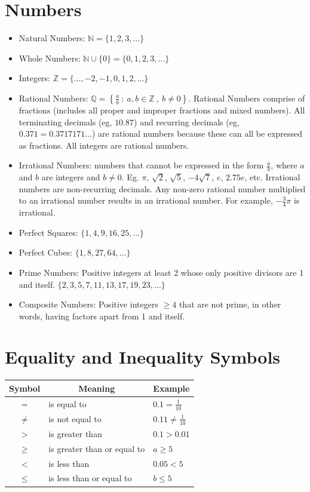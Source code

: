 \documentclass[twocolumn]{article}
\begin{document}
\section*{Numbers}

\begin{itemize}
\item Natural Numbers: $\mathbb{N} = \{1,2,3, \ldots\}$
\item Whole Numbers: $\mathbb{N} \cup \{0\} =\{0,1,2,3, \ldots\}$
\item Integers: $\mathbb{Z} =\{\ldots,-2,-1,0,1,2, \ldots\}$
\item Rational Numbers: $\mathbb{Q} = \left\{\frac{a}{b} \ : \  a, b \in \mathbb{Z} \ , \ b \neq 0 \right\}$. Rational Numbers comprise of fractions (includes all proper and improper fractions and mixed numbers). All terminating decimals (eg, $10.87$) and recurring decimals (eg, $0.3\dot{7}\dot{1} = 0.3717171\ldots$) are rational numbers because these can all be expressed as fractions. All integers are rational numbers.
\item Irrational Numbers: numbers that cannot be expressed in the form $\frac{a}{b}$, where $a$ and $b$ are integers and $b \neq 0$. Eg. $\pi$, $\sqrt{2}$, $\sqrt{5}$, $-4\sqrt{7}$, $e$, $2.75e$, etc. Irrational numbers are non-recurring decimals. Any non-zero rational number multiplied to an irrational number results in an irrational number. For example, $-\frac{3}{4}\pi$ is irrational.
\item Perfect Squares: $\{1,4,9,16,25, \ldots\}$
\item Perfect Cubes: $\{1,8,27,64, \ldots\}$
\item Prime Numbers: Positive integers at least 2 whose only positive divisors are 1 and itself. $\{2,3,5,7,11,13,17,19,23, \ldots\}$
\item Composite Numbers: Positive integers $\geq 4$ that are not prime, in other words, having factors apart from 1 and itself.
\end{itemize}

\section*{Equality and Inequality Symbols}

\begin{tabular}{|c|l|l|}
	\hline Symbol & \multicolumn{1}{|c|}{ Meaning } & \multicolumn{1}{|c|}{ Example } \\
	\hline$=$ & is equal to & $0.1=\frac{1}{10}$ \\
	\hline$\neq$ & is not equal to & $0.11 \neq \frac{1}{10}$ \\
	\hline$>$ & is greater than & $0.1>0.01$ \\
	\hline$\geqslant$ & is greater than or equal to & $a \geqslant 5$ \\
	\hline$<$ & is less than & $0.05<5$ \\
	\hline$\leqslant$ & is less than or equal to & $b \leqslant 5$ \\
	\hline
\end{tabular}
\end{document}
